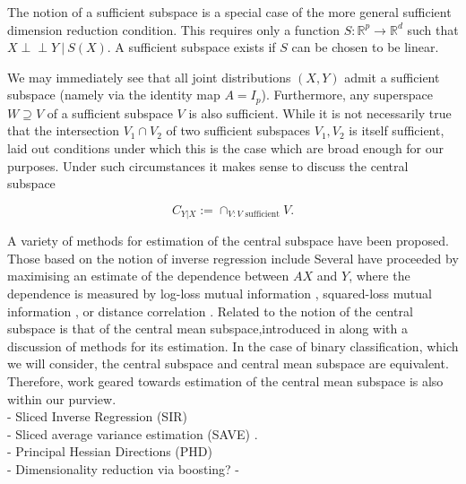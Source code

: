 \documentclass[12pt]{article}
\begin{document}
The notion of a sufficient subspace is a special case of the more general sufficient dimension reduction condition. This requires only a function $S:\mathbb{R}^p\rightarrow \mathbb{R}^d$ such that $X \perp\!\!\!\perp Y\ | \ S(X)$. A sufficient subspace exists if $S$ can be chosen to be linear. 

We may immediately see that all joint distributions $(X,Y)$ admit a sufficient subspace (namely via the identity map $A= I_p$). Furthermore, any superspace $W \supseteq V$ of a sufficient subspace $V$ is also sufficient. While it is not necessarily true that the intersection $V_1 \cap V_2$ of two sufficient subspaces $V_1,V_2$ is itself sufficient, \citet[Lemma 2]{cook_graphics_1996} laid out conditions under which this is the case which are broad enough for our purposes. Under such circumstances it makes sense to discuss the central subspace 

\begin{equation*}
    C_{Y|X} := \cap_{V: V\text{ sufficient}}V.
\end{equation*}

A variety of methods for estimation of the central subspace have been proposed. Those based on the notion of inverse regression include  Several have proceeded by maximising an estimate of the dependence between $AX$ and $Y$, where the dependence is measured by log-loss mutual information \citep{torkkola_feature_2003, suzuki_approximating_2008}, squared-loss mutual information \citep{suzuki_sufficient_2012, yamada_sufficient_2011}, or distance correlation \citep{vepakomma_supervised_2018}. Related to the notion of the central subspace is that of the central mean subspace,introduced in \citet{cook_dimension_2002} along with a discussion of methods for its estimation. In the case of binary classification, which we will consider, the central subspace and central mean subspace are equivalent. Therefore, work geared towards estimation of the central mean subspace \citep[see for example][]{ma_estimation_2014} is also within our purview.\\

- Sliced Inverse Regression (SIR) \citep{li_sliced_1991}\\

- Sliced average variance estimation (SAVE) \citep{cook_save_2000}. \\

- Principal Hessian Directions (PHD) \citep{li_principal_1992} \\

- Dimensionality reduction via boosting? -\\
\end{document}
